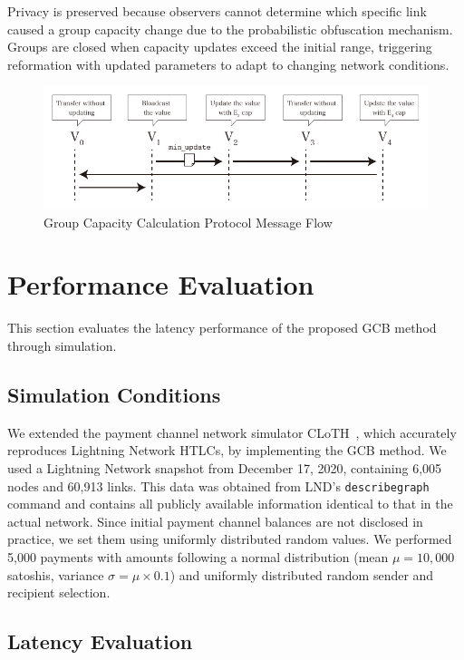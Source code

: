\documentclass[conference]{IEEEtran}
\begin{document}
Privacy is preserved because observers cannot determine which specific link caused a group capacity change due to the probabilistic obfuscation mechanism.
Groups are closed when capacity updates exceed the initial range, triggering reformation with updated parameters to adapt to changing network conditions.

\begin{figure}[htbp]
	\centerline{\includegraphics[width=\linewidth]{fig/group_cap_handover}}
	\caption{Group Capacity Calculation Protocol Message Flow}
	\label{fig:group_cap_handover}
\end{figure}

\section{Performance Evaluation}

This section evaluates the latency performance of the proposed GCB method through simulation.

\subsection{Simulation Conditions}
We extended the payment channel network simulator CLoTH~\cite{CONOSCENTI2021100717}, which accurately reproduces Lightning Network HTLCs, by implementing the GCB method.
We used a Lightning Network snapshot from December 17, 2020, containing 6,005 nodes and 60,913 links.
This data was obtained from LND's \texttt{describegraph} command and contains all publicly available information identical to that in the actual network.
Since initial payment channel balances are not disclosed in practice, we set them using uniformly distributed random values.
We performed 5,000 payments with amounts following a normal distribution (mean $\mu = 10,000$ satoshis, variance $\sigma = \mu \times 0.1$) and uniformly distributed random sender and recipient selection.

\subsection{Latency Evaluation}
\end{document}
